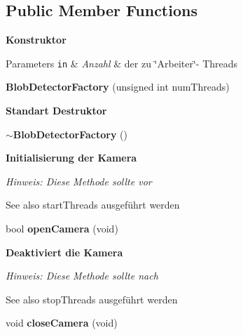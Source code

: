 \subsection*{Public Member Functions}
\begin{Indent}{\bf Konstruktor}\par
{\em 
\begin{DoxyParams}[1]{Parameters}
\mbox{\tt in}  & {\em Anzahl} & der zu \char`\"{}\+Arbeiter\char`\"{}-\/ Threads \\
\hline
\end{DoxyParams}
}\begin{DoxyCompactItemize}
\item 
\hypertarget{classrc_1_1BlobDetectorFactory_ad23d95cfe5c4a4204b5e1fc38c62dc8a}{{\bfseries Blob\+Detector\+Factory} (unsigned int num\+Threads)}\label{classrc_1_1BlobDetectorFactory_ad23d95cfe5c4a4204b5e1fc38c62dc8a}

\end{DoxyCompactItemize}
\end{Indent}
\begin{Indent}{\bf Standart Destruktor}\par
\begin{DoxyCompactItemize}
\item 
\hypertarget{classrc_1_1BlobDetectorFactory_a5532ab9249a1c53c4b87a968be4d6235}{{\bfseries $\sim$\+Blob\+Detector\+Factory} ()}\label{classrc_1_1BlobDetectorFactory_a5532ab9249a1c53c4b87a968be4d6235}

\end{DoxyCompactItemize}
\end{Indent}
\begin{Indent}{\bf Initialisierung der Kamera}\par
{\em Hinweis\+: Diese Methode sollte {\itshape vor}

\begin{DoxySeeAlso}{See also}
start\+Threads ausgeführt werden 
\end{DoxySeeAlso}
}\begin{DoxyCompactItemize}
\item 
\hypertarget{classrc_1_1BlobDetectorFactory_a8816a3c768cde4d4491f2ab06f875df3}{bool {\bfseries open\+Camera} (void)}\label{classrc_1_1BlobDetectorFactory_a8816a3c768cde4d4491f2ab06f875df3}

\end{DoxyCompactItemize}
\end{Indent}
\begin{Indent}{\bf Deaktiviert die Kamera}\par
{\em Hinweis\+: Diese Methode sollte {\itshape nach}

\begin{DoxySeeAlso}{See also}
stop\+Threads ausgeführt werden 
\end{DoxySeeAlso}
}\begin{DoxyCompactItemize}
\item 
\hypertarget{classrc_1_1BlobDetectorFactory_a847250d92a85518c9701ab8152c542f5}{void {\bfseries close\+Camera} (void)}\label{classrc_1_1BlobDetectorFactory_a847250d92a85518c9701ab8152c542f5}

\end{DoxyCompactItemize}
\end{Indent}
